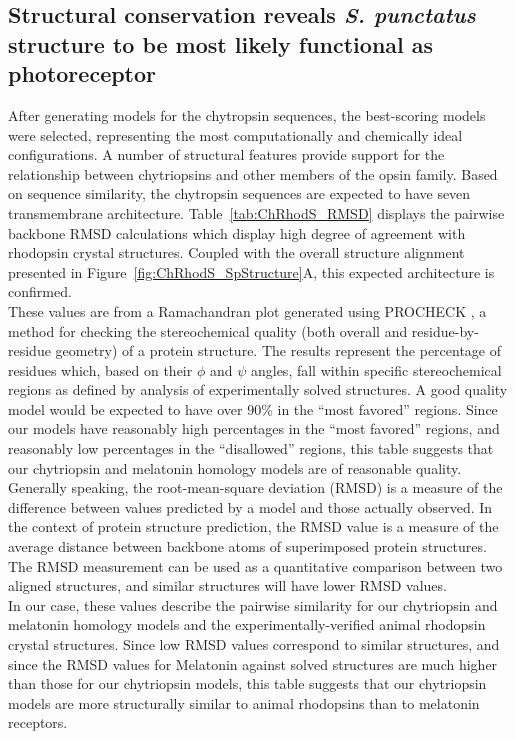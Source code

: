 \subsection*{Structural conservation reveals \textit{S. punctatus} structure to be most likely functional as photoreceptor}
\indent After generating models for the chytropsin sequences, the best-scoring models were selected, representing the most computationally and chemically ideal configurations. A number of structural features provide support for the relationship between chytriopsins and other members of the opsin family. Based on sequence similarity, the chytropsin sequences are expected to have seven transmembrane architecture. Table~\ref{tab:ChRhodS_RMSD} displays the pairwise backbone RMSD calculations which display high degree of agreement with rhodopsin crystal structures. Coupled with the overall structure alignment presented in Figure~\ref{fig:ChRhodS_SpStructure}A, this expected architecture is confirmed. \\
\indent These values are from a Ramachandran plot \cite{Ramachandran1963} generated using PROCHECK \cite{Laskowski1993}, a method for checking the stereochemical quality (both overall and residue-by-residue geometry) of a protein structure. The results represent the percentage of residues which, based on their $\phi$ and $\psi$ angles, fall within specific stereochemical regions as defined by analysis of experimentally solved structures. A good quality model would be expected to have over 90\% in the \enquote{most favored} regions. Since our models have reasonably high percentages in the \enquote{most favored} regions, and reasonably low percentages in the \enquote{disallowed} regions, this table suggests that our chytriopsin and melatonin homology models are of reasonable quality.\\
\indent Generally speaking, the root-mean-square deviation (RMSD) is a measure of the difference between values predicted by a model and those actually observed. In the context of protein structure prediction, the RMSD value is a measure of the average distance between backbone atoms of superimposed protein structures. The RMSD measurement can be used as a quantitative comparison between two aligned structures, and similar structures will have lower RMSD values. \\
\indent In our case, these values describe the pairwise similarity for our chytriopsin and melatonin homology models and the experimentally-verified animal rhodopsin crystal structures. Since low RMSD values correspond to similar structures, and since the RMSD values for Melatonin against solved structures are much higher than those for our chytriopsin models, this table suggests that our chytriopsin models are more structurally similar to animal rhodopsins than to melatonin receptors.\\
